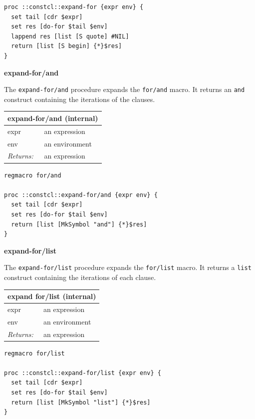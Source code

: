 \documentclass[twoside,9pt]{report}
\begin{document}
\noindent\makebox[\linewidth]{\rule{\linewidth}{0.4pt}}
\begin{lstlisting}
proc ::constcl::expand-for {expr env} {
  set tail [cdr $expr]
  set res [do-for $tail $env]
  lappend res [list [S quote] #NIL]
  return [list [S begin] {*}$res]
}
\end{lstlisting}
\noindent\makebox[\linewidth]{\rule{\linewidth}{0.4pt}}

\textbf{expand-for/and}


The \texttt{expand-for/and} procedure expands the \texttt{for/and} macro. It returns an \texttt{and} construct containing the iterations of the clauses.

\begin{tabular}{ |l l| }
\hline
\multicolumn{2}{|l|}{expand-for/and (internal)} \\
\hline
expr & an expression \\
env & an environment \\
\textit{Returns:} & an expression \\
\hline
\end{tabular}

\noindent\makebox[\linewidth]{\rule{\linewidth}{0.4pt}}
\begin{lstlisting}
regmacro for/and
 
proc ::constcl::expand-for/and {expr env} {
  set tail [cdr $expr]
  set res [do-for $tail $env]
  return [list [MkSymbol "and"] {*}$res]
}
\end{lstlisting}
\noindent\makebox[\linewidth]{\rule{\linewidth}{0.4pt}}

\textbf{expand-for/list}


The \texttt{expand-for/list} procedure expands the \texttt{for/list} macro. It returns a \texttt{list} construct containing the iterations of each clause.

\begin{tabular}{ |l l| }
\hline
\multicolumn{2}{|l|}{expand for/list (internal)} \\
\hline
expr & an expression \\
env & an environment \\
\textit{Returns:} & an expression \\
\hline
\end{tabular}

\noindent\makebox[\linewidth]{\rule{\linewidth}{0.4pt}}
\begin{lstlisting}
regmacro for/list
 
proc ::constcl::expand-for/list {expr env} {
  set tail [cdr $expr]
  set res [do-for $tail $env]
  return [list [MkSymbol "list"] {*}$res]
}
\end{lstlisting}
\noindent\makebox[\linewidth]{\rule{\linewidth}{0.4pt}}
\end{document}
